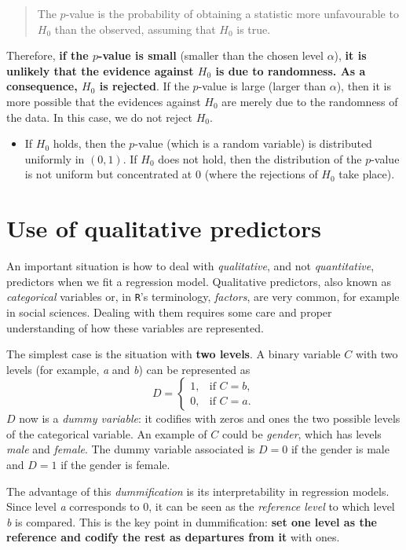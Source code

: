 \documentclass[]{book}
\newenvironment{rmdblock}[1]
  {\begin{shaded*}
  \begin{itemize}
  \renewcommand{\labelitemi}{
    \raisebox{-.7\height}[0pt][0pt]{
      {\setkeys{Gin}{width=2em,keepaspectratio}\texttt{[image: img/icons/\#1]}}
    }
  }
  \item
  }
  {
  \end{itemize}
  \end{shaded*}
  }
\newenvironment{rmdinsight}
  {\begin{rmdblock}{insight}}
  {\end{rmdblock}}
\theoremstyle{definition}
\theoremstyle{definition}
\theoremstyle{definition}
\theoremstyle{remark}
\begin{document}
\begin{quote}
The \(p\)-value is the probability of obtaining a statistic more
unfavourable to \(H_0\) than the observed, assuming that \(H_0\) is
true.
\end{quote}

Therefore, \textbf{if the \(p\)-value is small} (smaller than the chosen
level \(\alpha\)), \textbf{it is unlikely that the evidence against
\(H_0\) is due to randomness. As a consequence, \(H_0\) is rejected}. If
the \(p\)-value is large (larger than \(\alpha\)), then it is more
possible that the evidences against \(H_0\) are merely due to the
randomness of the data. In this case, we do not reject \(H_0\).

\begin{rmdinsight}
If \(H_0\) holds, then the \(p\)-value (which is a random variable) is
distributed uniformly in \((0,1)\). If \(H_0\) does not hold, then the
distribution of the \(p\)-value is not uniform but concentrated at \(0\)
(where the rejections of \(H_0\) take place).
\end{rmdinsight}

\chapter{Use of qualitative predictors}\label{use-qual}

An important situation is how to deal with \emph{qualitative}, and not
\emph{quantitative}, predictors when we fit a regression model.
Qualitative predictors, also known as \emph{categorical} variables or,
in \texttt{R}'s terminology, \emph{factors}, are very common, for
example in social sciences. Dealing with them requires some care and
proper understanding of how these variables are represented.

The simplest case is the situation with \textbf{two levels}. A binary
variable \(C\) with two levels (for example, \emph{a} and \emph{b}) can
be represented as \[
D=\left\{\begin{array}{ll}
1,&\text{if }C=b,\\
0,&\text{if }C=a.
\end{array}\right.
\] \(D\) now is a \emph{dummy variable}: it codifies with zeros and ones
the two possible levels of the categorical variable. An example of \(C\)
could be \emph{gender}, which has levels \emph{male} and \emph{female}.
The dummy variable associated is \(D=0\) if the gender is male and
\(D=1\) if the gender is female.

The advantage of this \emph{dummification} is its interpretability in
regression models. Since level \emph{a} corresponds to \(0\), it can be
seen as the \emph{reference level} to which level \emph{b} is compared.
This is the key point in dummification: \textbf{set one level as the
reference and codify the rest as departures from it} with ones.
\end{document}
